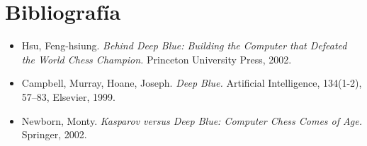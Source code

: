 \documentclass[12pt,a4paper]{article}
\begin{document}
\section*{Bibliografía}
\begin{itemize}
    \item Hsu, Feng-hsiung. \textit{Behind Deep Blue: Building the Computer that Defeated the World Chess Champion.} Princeton University Press, 2002.
    \item Campbell, Murray, Hoane, Joseph. \textit{Deep Blue.} Artificial Intelligence, 134(1-2), 57--83, Elsevier, 1999.
    \item Newborn, Monty. \textit{Kasparov versus Deep Blue: Computer Chess Comes of Age.} Springer, 2002.
\end{itemize}
\end{document}
